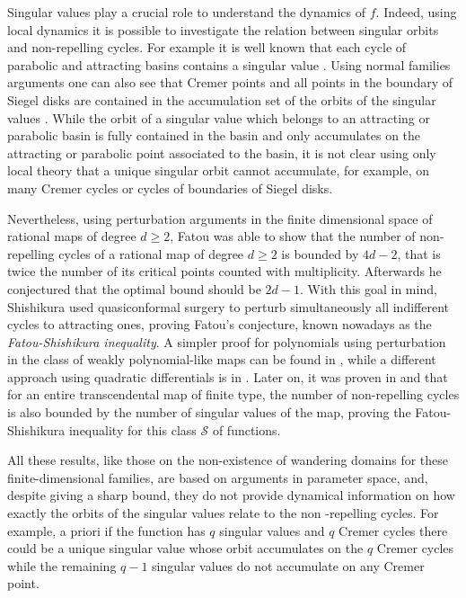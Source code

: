 \documentclass[11pt, twoside]{article}
\theoremstyle{definition}
\begin{document}
Singular values play a crucial role to understand the dynamics of $f$. Indeed, using local dynamics it is possible to investigate the relation between  singular orbits and non-repelling cycles. For example it is well known that each cycle of parabolic and attracting basins contains a singular value \cite{Fa20,Mi}. Using normal families arguments one can also see that Cremer points and all points in the boundary of Siegel disks are contained in the accumulation set of the orbits of the singular values \cite{Fa20,Mi}.
 While the orbit of a singular value which belongs to an attracting or parabolic basin is fully contained  in the basin and only accumulates on the attracting or parabolic point associated to the basin,  it is not clear using only local theory that a unique singular orbit cannot accumulate, for example, on many Cremer cycles or cycles of boundaries of Siegel disks. 
 
Nevertheless, using perturbation arguments in the finite dimensional space of rational maps of degree $d\geq 2$,  Fatou \cite{Fa20} was able to show that the number of non-repelling cycles of a rational map of degree $d\geq 2$ is bounded by  $4d-2$, that is twice the number of its critical points counted with multiplicity. 
 Afterwards he conjectured that the optimal bound should be $2d-1$. 
With this goal in mind, Shishikura  \cite{Sh87} used quasiconformal surgery   to  perturb simultaneously all indifferent cycles to attracting ones, proving Fatou's conjecture, known nowadays as the \emph{Fatou-Shishikura inequality}. A simpler proof for polynomials using perturbation in the class of weakly polynomial-like maps can be found in \cite{DH85}, while  a  different approach using quadratic differentials is in \cite{Ep}.
Later on, it was proven in \cite[Theorem 5]{EL92} and \cite{GK} that  for an  entire transcendental map of finite type,  the number of non-repelling cycles is also bounded by the number of singular values of the map, proving the Fatou-Shishikura inequality for this class $\mathcal{S}$ of functions. 

All these results, like those on the non-existence of wandering domains for these finite-dimensional families,  are based on arguments in parameter space, and, despite giving a sharp bound, they do not provide dynamical information on how exactly the orbits of the singular values relate to the non -repelling cycles. For example, a priori  if the function has $q$ singular values and $q$ Cremer cycles there could be a unique singular value whose orbit  accumulates on the $q$ Cremer cycles while the remaining $q-1$ singular values do not accumulate on any Cremer point. 
\end{document}
